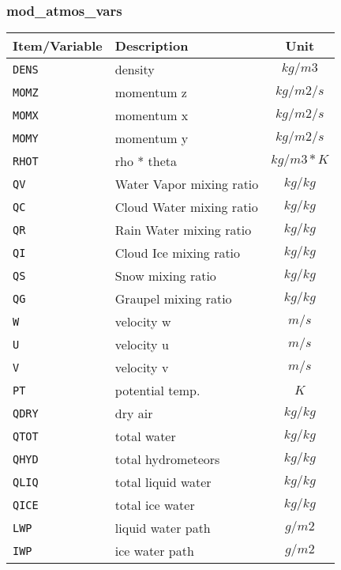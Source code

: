 \subsubsection{mod\_atmos\_vars}
 \begin{tabularx}{150mm}{|l|X|c|} \hline
 \rowcolor[gray]{0.9} Item/Variable & Description  & Unit \\ \hline
  \verb|DENS|   &  density                   & $kg/m3$   \\\hline
  \verb|MOMZ|   &  momentum z                & $kg/m2/s$ \\\hline
  \verb|MOMX|   &  momentum x                & $kg/m2/s$ \\\hline
  \verb|MOMY|   &  momentum y                & $kg/m2/s$ \\\hline
  \verb|RHOT|   &  rho * theta              & $kg/m3*K$ \\\hline
  \verb|QV|     &  Water Vapor mixing ratio  & $kg/kg$ \\\hline
  \verb|QC|     &  Cloud Water mixing ratio  & $kg/kg$ \\\hline
  \verb|QR|     &  Rain Water mixing ratio   & $kg/kg$ \\\hline
  \verb|QI|     &  Cloud Ice mixing ratio    & $kg/kg$ \\\hline
  \verb|QS|     &  Snow mixing ratio         & $kg/kg$ \\\hline
  \verb|QG|     &  Graupel mixing ratio      & $kg/kg$ \\\hline
  \verb|W|      &  velocity w                & $m/s$   \\\hline
  \verb|U|      &  velocity u                & $m/s$   \\\hline
  \verb|V|      &  velocity v                & $m/s$   \\\hline
  \verb|PT|     &  potential temp.           & $K$     \\\hline
  \verb|QDRY|   &  dry air                   & $kg/kg$ \\\hline
  \verb|QTOT|   &  total water               & $kg/kg$ \\\hline
  \verb|QHYD|   &  total hydrometeors        & $kg/kg$ \\\hline
  \verb|QLIQ|   &  total liquid water        & $kg/kg$ \\\hline
  \verb|QICE|   &  total ice water           & $kg/kg$ \\\hline
  \verb|LWP|    &  liquid water path         & $g/m2$  \\\hline
  \verb|IWP|    &  ice water path            & $g/m2$  \\\hline

\end{tabularx}
